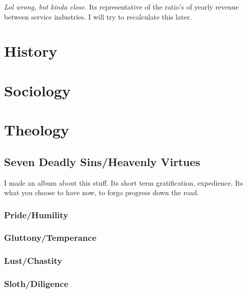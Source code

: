 \documentclass{article}
\begin{document}
\textit{Lol wrong, but kinda close.} Its representative of the ratio's of yearly revenue between service industries. I will try to recalculate this later. 



\newpage





\section{History}

\newpage







\section{Sociology}

\newpage



\section{Theology}

\subsection{Seven Deadly Sins/Heavenly Virtues}

I made an album about this stuff. Its short term gratification, expedience. Its what you choose to have now, to forgo progress down the road. 

\subsubsection{Pride/Humility}

\subsubsection{Gluttony/Temperance}

\subsubsection{Lust/Chastity}

\subsubsection{Sloth/Diligence}
\end{document}
